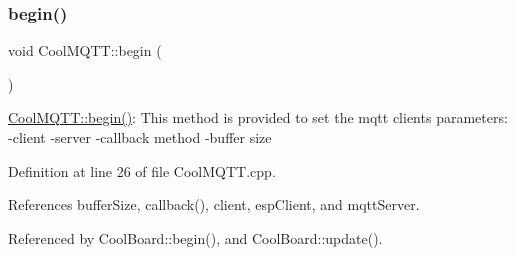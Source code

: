 \subsubsection{\texorpdfstring{begin()}{begin()}}
{\footnotesize\ttfamily void Cool\+M\+Q\+T\+T\+::begin (\begin{DoxyParamCaption}{ }\end{DoxyParamCaption})}

\hyperlink{classCoolMQTT_ac9248808641ebf3054ed0620ea9d0100}{Cool\+M\+Q\+T\+T\+::begin()}\+: This method is provided to set the mqtt client\textquotesingle{}s parameters\+: -\/client -\/server -\/callback method -\/buffer size 

Definition at line 26 of file Cool\+M\+Q\+T\+T.\+cpp.



References buffer\+Size, callback(), client, esp\+Client, and mqtt\+Server.



Referenced by Cool\+Board\+::begin(), and Cool\+Board\+::update().


